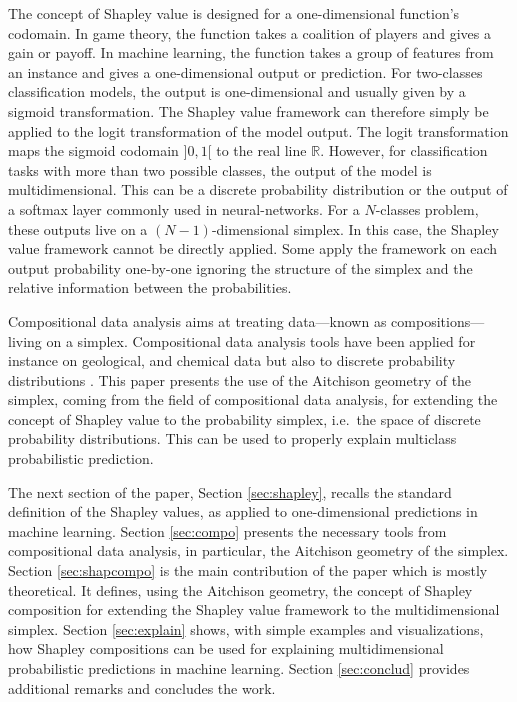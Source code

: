 \documentclass{article}
\theoremstyle{plain}
\theoremstyle{definition}
\theoremstyle{remark}
\begin{document}
The concept of Shapley value is designed for a one-dimensional function's codomain. In game theory, the function takes a coalition of players and gives a gain or payoff. In machine learning, the function takes a group of features from an instance and gives a one-dimensional output or prediction. For two-classes classification models, the output is one-dimensional and usually given by a sigmoid transformation. The Shapley value framework can therefore simply be applied to the logit transformation of the model output. The logit transformation maps the sigmoid codomain $]0,1[$ to the real line $\mathbb{R}$. However, for classification tasks with more than two possible classes, the output of the model is multidimensional. This can be a discrete probability distribution or the output of a softmax layer commonly used in neural-networks. For a $N$-classes problem, these outputs live on a $(N-1)$-dimensional simplex. In this case, the Shapley value framework cannot be directly applied. Some apply the framework on each output probability one-by-one ignoring the structure of the simplex and the relative information between the probabilities.

Compositional data analysis \cite{aitchison1982,pawlowskymodeling} aims at treating data---known as compositions---living on a simplex. Compositional data analysis tools have been applied for instance on geological, and chemical data but also to discrete probability distributions \cite{egozcue2011evidence,egozcue2018evidence,noe2023representing}. This paper presents the use of the Aitchison geometry of the simplex, coming from the field of compositional data analysis, for extending the concept of Shapley value to the probability simplex, i.e.~the space of discrete probability distributions. This can be used to properly explain multiclass probabilistic prediction.

The next section of the paper, Section \ref{sec:shapley}, recalls the standard definition of the Shapley values, as applied to one-dimensional predictions in machine learning. Section \ref{sec:compo} presents the necessary tools from compositional data analysis, in particular, the Aitchison geometry of the simplex. Section \ref{sec:shapcompo} is the main contribution of the paper which is mostly theoretical. It defines, using the Aitchison geometry, the concept of Shapley composition for extending the Shapley value framework to the multidimensional simplex. Section \ref{sec:explain} shows, with simple examples and visualizations, how Shapley compositions can be used for explaining multidimensional probabilistic predictions in machine learning. Section \ref{sec:conclud} provides additional remarks and concludes the work.
\end{document}
